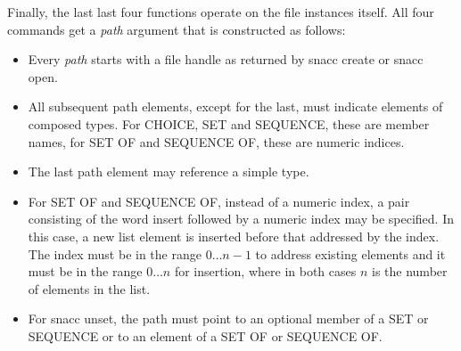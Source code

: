 Finally, the last last four functions operate on the file instances itself.
All four commands get a \emph{path} argument that is constructed as follows:
\begin{itemize}
  \item Every \emph{path} starts with a file handle as returned by {\Tcl snacc create} or {\Tcl snacc open}.
  \item All subsequent path elements, except for the last, must indicate elements of composed types.
    For CHOICE, SET and SEQUENCE, these are member names, for SET OF and SEQUENCE OF, these are numeric indices.
  \item The last path element may reference a simple type.
  \item For SET OF and SEQUENCE OF, instead of a numeric index, a pair consisting of the word {\Tcl insert} followed by a numeric index may be specified.
    In this case, a new list element is inserted before that addressed by the index.
    The index must be in the range $0\ldots{}n-1$ to address existing elements and it must be in the range $0\ldots{}n$ for insertion, where in both cases $n$ is the number of elements in the list.
  \item For {\Tcl snacc unset}, the path must point to an optional member of a SET or SEQUENCE or to an element of a SET OF or SEQUENCE OF.
\end{itemize}

